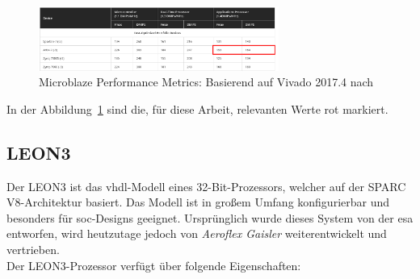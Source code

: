 \begin{figure}[H]
\centering
\includegraphics[width=0.7\textwidth]{Hauptteil/microblazeleistung.png}
\caption{Microblaze Performance Metrics: Basierend auf Vivado 2017.4 nach~\cite{microblaze}}
\label{fig:microblazeleistung}
\end{figure}

In der Abbildung~\ref{fig:microblazeleistung} sind die, für diese Arbeit, relevanten Werte rot markiert.\\

\subsection{LEON3}\label{kap:leon3}


Der LEON3 ist das \ac{vhdl}-Modell eines 32-Bit-Prozessors, welcher auf der SPARC V8-Architektur basiert. Das Modell ist in großem Umfang konfigurierbar und besonders für \ac{soc}-Designs geeignet.
Ursprünglich wurde dieses System von der \ac{esa} entworfen, wird heutzutage jedoch von \emph{Aeroflex Gaisler} weiterentwickelt und vertrieben.\\
Der LEON3-Prozessor verfügt über folgende Eigenschaften:\cite{leon}\\

